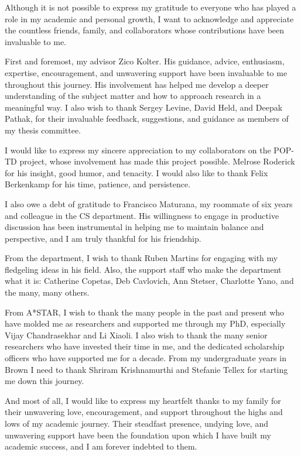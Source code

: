 \documentclass[12pt]{cmuthesis}
\begin{document}
\cleardoublepage

\begin{acknowledgments}
	Although it is not possible to express my gratitude to everyone who has played a role in my academic and personal growth, I want to acknowledge and appreciate the countless friends, family, and collaborators whose contributions have been invaluable to me.

	First and foremost, my advisor Zico Kolter. His guidance, advice, enthusiasm, expertise, encouragement, and unwavering support have been invaluable to me throughout this journey. His involvement has helped me develop a deeper understanding of the subject matter and how to approach research in a meaningful way. I also wish to thank Sergey Levine, David Held, and Deepak Pathak, for their invaluable feedback, suggestions, and guidance as members of my thesis committee.

	I would like to express my sincere appreciation to my collaborators on the POP-TD project, whose involvement has made this project possible. Melrose Roderick for his insight, good humor, and tenacity. I would also like to thank Felix Berkenkamp for his time, patience, and persistence.

	I also owe a debt of gratitude to Francisco Maturana, my roommate of six years and colleague in the CS department. His willingness to engage in productive discussion has been instrumental in helping me to maintain balance and perspective, and I am truly thankful for his friendship.

	From the department, I wish to thank Ruben Martins for engaging with my fledgeling ideas in his field. Also, the support staff who make the department what it is: Catherine Copetas, Deb Cavlovich, Ann Stetser, Charlotte Yano, and the many, many others.
	\clearpage

	From A*STAR, I wish to thank the many people in the past and present who have molded me as researchers and supported me through my PhD, especially Vijay Chandrasekhar and Li Xiaoli. I also wish to thank the many senior researchers who have invested their time in me, and the dedicated scholarship officers who have supported me for a decade. From my undergraduate years in Brown I need to thank Shriram Krishnamurthi and Stefanie Tellex for starting me down this journey.

	And most of all, I would like to express my heartfelt thanks to my family for their unwavering love, encouragement, and support throughout the highs and lows of my academic journey. Their steadfast presence, undying love, and unwavering support have been the foundation upon which I have built my academic success, and I am forever indebted to them.
\end{acknowledgments}
\end{document}
